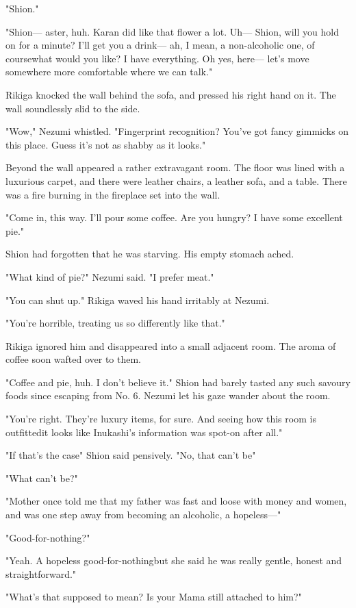 "Shion."

"Shion--- aster, huh. Karan did like that flower a lot. Uh--- Shion, will
you hold on for a minute? I'll get you a drink--- ah, I mean, a
non-alcoholic one, of course\el what would you like? I have everything.
Oh yes, here--- let's move somewhere more comfortable where we can talk."

Rikiga knocked the wall behind the sofa, and pressed his right hand on
it. The wall soundlessly slid to the side.

"Wow," Nezumi whistled. "Fingerprint recognition? You've got fancy
gimmicks on this place. Guess it's not as shabby as it looks."

Beyond the wall appeared a rather extravagant room. The floor was lined
with a luxurious carpet, and there were leather chairs, a leather sofa,
and a table. There was a fire burning in the fireplace set into the
wall.

"Come in, this way. I'll pour some coffee. Are you hungry? I have some
excellent pie."

Shion had forgotten that he was starving. His empty stomach ached.

"What kind of pie?" Nezumi said. "I prefer meat."

"You can shut up." Rikiga waved his hand irritably at Nezumi.

"You're horrible, treating us so differently like that."

Rikiga ignored him and disappeared into a small adjacent room. The aroma
of coffee soon wafted over to them.

"Coffee and pie, huh. I don't believe it." Shion had barely tasted any
such savoury foods since escaping from No. 6. Nezumi let his gaze wander
about the room.

"You're right. They're luxury items, for sure. And seeing how this room
is outfitted\el it looks like Inukashi's information was spot-on after
all."

"If that's the case\el " Shion said pensively. "No, that can't be\el "

"What can't be?"

"Mother once told me that my father was fast and loose with money and
women, and was one step away from becoming an alcoholic, a hopeless---"

"Good-for-nothing?"

"Yeah. A hopeless good-for-nothing\el but she said he was really gentle,
honest and straightforward."

"What's that supposed to mean? Is your Mama still attached to him?"

